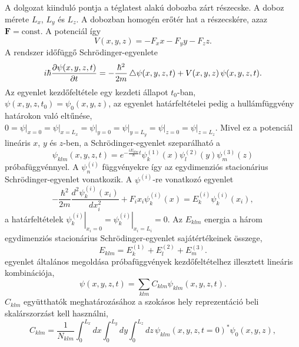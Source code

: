 A dolgozat kiinduló pontja a téglatest alakú dobozba zárt részecske. A doboz mérete $L_x$, $L_y$ és $L_z$. A dobozban homogén erőtér hat a részecskére, azaz $\boldsymbol{F} = \text{const}$. A potenciál így
\begin{equation}
	V(x, y, z) = -F_xx-F_yy-F_zz.
\end{equation}
A rendszer időfüggő Schrödinger-egyenlete
\begin{equation}
	i\hbar\frac{\partial \psi(x, y, z, t)}{\partial t} = -\frac{\hbar^2}{2m} \mathop{}\!\mathbin\bigtriangleup \psi(x, y, z, t) + V(x, y, z)\,\psi(x, y, z, t).
	\label{3dbox:3dscheq}
\end{equation}
Az egyenlet kezdőfeltétele egy kezdeti állapot $t_0$-ban, $\psi(x, y, z, t_0) = \psi_0(x, y, z)$, az egyenlet határfeltételei pedig a hullámfüggvény határokon való eltűnése, $0=\left.\psi\right|_{x=0}=\left.\psi\right|_{x=L_x}=\left.\psi\right|_{y=0}=\left.\psi\right|_{y=L_y}=\left.\psi\right|_{z=0}=\left.\psi\right|_{z=L_z}$. Mivel ez a potenciál lineáris $x$, $y$ és $z$-ben, a Schrödinger-egyenlet szeparálható a
\begin{equation}
	\psi_{klm}(x, y, z, t) = e^{-\frac{iE_{klm}}{\hbar}t}\psi^{(1)}_k(x)\psi^{(2)}_l(y)\psi^{(3)}_m(z)
	\label{3dox:3dansatz}
\end{equation}
próbafüggvénnyel. A $\psi^{(i)}_n$ függvényekre így az egydimenziós stacionárius Schrödinger-egyenlet vonatkozik. A $\psi^{(i)}$-re vonatkozó egyenlet 
\begin{equation}
	-\frac{\hbar^2}{2m}\frac{d^2\psi^{(i)}_k(x_i)}{dx_i^2} + F_ix_i\psi^{(i)}_k(x) = E^{(i)}_k\psi^{(i)}_k(x_i),
	\label{3dbox:1deq}
\end{equation}
a határfeltételek $\left.\psi^{(i)}_k\right|_{x_i=0}=\left.\psi^{(i)}_k\right|_{x_i=L_i}=0$. Az $E_{klm}$ energia a három egydimenziós stacionárius Schrödinger-egyenlet sajátértékeinek összege,
\begin{equation}
	E_{klm} = E^{(1)}_k+E^{(2)}_l+E^{(3)}_m.
\end{equation}
 egyenlet általános megoldása  próbafüggvények kezdőfeltételhez illesztett lineáris kombinációja,
\begin{equation}
	\psi(x,y,z,t) = \sum_{klm}C_{klm}\psi_{klm}(x,y,z,t).
	\label{3dbox:timeevolution}
\end{equation}
$C_{klm}$ együtthatók meghatározásához a szokásos hely reprezentáció beli skalárszorzást kell használni,
\begin{equation}
	C_{klm} = \frac{1}{N_{klm}}\int_0^{L_x}dx\int_0^{L_y}dy\int_0^{L_z}dz\,\psi_{klm}(x, y, z, t=0)^*\psi_0(x, y, z),
	\label{3dbox:ceq}
\end{equation}
